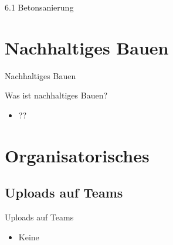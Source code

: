 \begin{frame}{6.1 Betonsanierung}

\end{frame}

\section{Nachhaltiges Bauen}
\BlueSectionSlide

\begin{frame}{Nachhaltiges Bauen}
\begin{block}{Was ist nachhaltiges Bauen?}
    \begin{itemize}
        \item[\textbullet] ??
    \end{itemize}
\end{block}
\end{frame}


\section{Organisatorisches}
\BlueSectionSlide

\subsection{Uploads auf Teams}
\begin{frame}{Uploads auf Teams}
    \begin{itemize}
        \item[\textbullet] Keine
    \end{itemize}

\end{frame}



